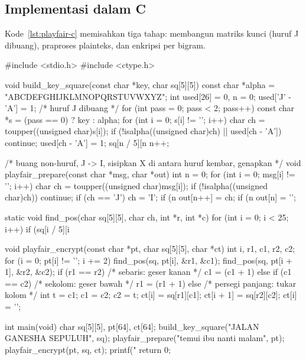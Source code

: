 \subsection{Implementasi dalam C}

Kode~\ref{lst:playfair-c} memisahkan tiga tahap: membangun matriks kunci (huruf J dibuang), praproses plainteks, dan enkripsi per bigram.

\begin{ccode}[caption={Playfair cipher dalam C}, label={lst:playfair-c}]
#include <stdio.h>
#include <ctype.h>

void build_key_square(const char *key, char sq[5][5]) {
    const char *alpha = "ABCDEFGHIJKLMNOPQRSTUVWXYZ";
    int used[26] = {0}, n = 0;
    used['J' - 'A'] = 1;                       /* huruf J dibuang */
    for (int pass = 0; pass < 2; pass++) {
        const char *s = (pass == 0) ? key : alpha;
        for (int i = 0; s[i] != '\0'; i++) {
            char ch = toupper((unsigned char)s[i]);
            if (!isalpha((unsigned char)ch) || used[ch - 'A']) continue;
            used[ch - 'A'] = 1;
            sq[n / 5][n %
            n++;
        }
    }
}

/* buang non-huruf, J -> I, sisipkan X di antara huruf kembar, genapkan */
void playfair_prepare(const char *msg, char *out) {
    int n = 0;
    for (int i = 0; msg[i] != '\0'; i++) {
        char ch = toupper((unsigned char)msg[i]);
        if (!isalpha((unsigned char)ch)) continue;
        if (ch == 'J') ch = 'I';
        if (n %
        out[n++] = ch;
    }
    if (n %
    out[n] = '\0';
}

static void find_pos(char sq[5][5], char ch, int *r, int *c) {
    for (int i = 0; i < 25; i++)
        if (sq[i / 5][i %
}

void playfair_encrypt(const char *pt, char sq[5][5], char *ct) {
    int i, r1, c1, r2, c2;
    for (i = 0; pt[i] != '\0'; i += 2) {
        find_pos(sq, pt[i], &r1, &c1);
        find_pos(sq, pt[i + 1], &r2, &c2);
        if (r1 == r2) {                        /* sebaris: geser kanan */
            c1 = (c1 + 1) %
        } else if (c1 == c2) {                 /* sekolom: geser bawah */
            r1 = (r1 + 1) %
        } else {                               /* persegi panjang: tukar kolom */
            int t = c1;  c1 = c2;  c2 = t;
        }
        ct[i] = sq[r1][c1];
        ct[i + 1] = sq[r2][c2];
    }
    ct[i] = '\0';
}

int main(void) {
    char sq[5][5], pt[64], ct[64];
    build_key_square("JALAN GANESHA SEPULUH", sq);
    playfair_prepare("temui ibu nanti malam", pt);
    playfair_encrypt(pt, sq, ct);
    printf("%
    return 0;
}
\end{ccode}


